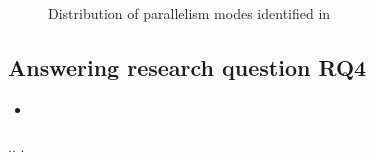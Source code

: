 \begin{figure}[h!]
    \centering
    \caption{\label{fig:freqmodes}Distribution of parallelism modes
    identified in  }
\end{figure}


\subsection{Answering research question RQ4}
\label{sec:rqD}

\begin{itemize}
    \item \emph{\RQD}
\end{itemize}

.. .

\Fix{---------------------}


